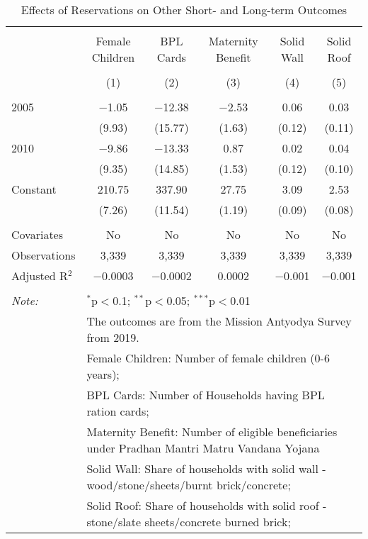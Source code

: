 
\begin{table}[!htbp] \centering 
  \caption{Effects of Reservations on Other Short- and Long-term Outcomes} 
  \label{raj_shrug_other_05_10} 
\scriptsize 
\begin{tabular}{@{\extracolsep{0pt}}lccccc} 
\\[-1.8ex]\hline 
\hline \\[-1.8ex] 
 & Female Children & BPL Cards & Maternity Benefit & Solid Wall & Solid Roof \\ 
\\[-1.8ex] & (1) & (2) & (3) & (4) & (5)\\ 
\hline \\[-1.8ex] 
 2005 & $-$1.05 & $-$12.38 & $-$2.53 & 0.06 & 0.03 \\ 
  & (9.93) & (15.77) & (1.63) & (0.12) & (0.11) \\ 
  2010 & $-$9.86 & $-$13.33 & 0.87 & 0.02 & 0.04 \\ 
  & (9.35) & (14.85) & (1.53) & (0.12) & (0.10) \\ 
  Constant & 210.75 & 337.90 & 27.75 & 3.09 & 2.53 \\ 
  & (7.26) & (11.54) & (1.19) & (0.09) & (0.08) \\ 
 \hline \\[-1.8ex] 
Covariates & No & No & No & No & No \\ 
Observations & 3,339 & 3,339 & 3,339 & 3,339 & 3,339 \\ 
Adjusted R$^{2}$ & $-$0.0003 & $-$0.0002 & 0.0002 & $-$0.001 & $-$0.001 \\ 
\hline 
\hline \\[-1.8ex] 
\textit{Note:}  & \multicolumn{5}{l}{$^{*}$p$<$0.1; $^{**}$p$<$0.05; $^{***}$p$<$0.01} \\ 
 & \multicolumn{5}{l}{The outcomes are from the Mission Antyodya Survey from 2019.} \\ 
 & \multicolumn{5}{l}{Female Children: Number of female children (0-6 years);} \\ 
 & \multicolumn{5}{l}{BPL Cards: Number of Households having BPL ration cards;} \\ 
 & \multicolumn{5}{l}{Maternity Benefit: Number of eligible beneficiaries under Pradhan Mantri Matru Vandana Yojana} \\ 
 & \multicolumn{5}{l}{Solid Wall: Share of households with solid wall - wood/stone/sheets/burnt brick/concrete;} \\ 
 & \multicolumn{5}{l}{Solid Roof: Share of households with solid roof - stone/slate sheets/concrete burned brick;} \\ 
\end{tabular} 
\end{table} 
